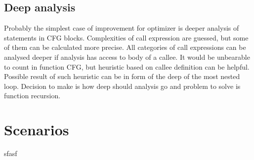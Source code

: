 \subsection{Deep analysis}
Probably the simplest case of improvement for optimizer is deeper analysis of statements in CFG blocks. Complexities of call expression are guessed, but some of them can be calculated more precise. All categories of call expressions can be analysed deeper if analysis has access to body of a callee. It would be unbearable to count in function CFG, but heuristic based on callee definition can be helpful. Possible result of such heuristic can be in form of the deep of the most nested loop. Decision to make is how deep should analysis go and problem to solve is function recursion.

\section{Scenarios}
sfasf